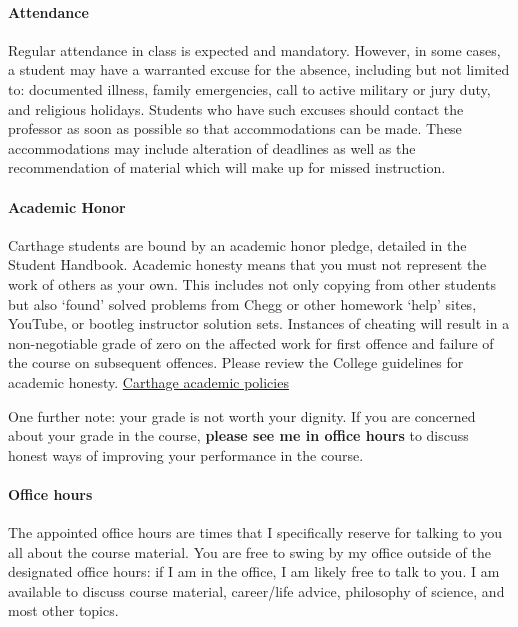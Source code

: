 \paragraph{Attendance}
Regular attendance in class is expected and mandatory. However, in some cases, a student may have a warranted excuse for the absence, including but not limited to: documented illness, family emergencies, call to active military or jury duty, and religious holidays. Students who have such excuses should contact the professor as soon as possible so that accommodations can be made. These accommodations may include alteration of deadlines as well as the recommendation of material which will make up for missed instruction.

\paragraph{Academic Honor} 
Carthage students are bound by an academic honor pledge, detailed in the Student Handbook. Academic honesty means that you must not represent the work of others as your own. This includes not only copying from other students but also ‘found’ solved problems from Chegg or other homework ‘help’ sites, YouTube, or bootleg instructor solution sets. Instances of cheating will result in a non-negotiable grade of zero on the affected work for first offence and failure of the course on subsequent offences. Please review the College guidelines for academic honesty. \href{https://www.carthage.edu/academics/carthage-curriculum/academic-policies/}{Carthage academic policies}

One further note: your grade is not worth your dignity. If you are concerned about your grade in the course, \textbf{please see me in office hours} to discuss honest ways of improving your performance in the course. 

\paragraph{Office hours}
The appointed office hours are times that I specifically reserve for talking to you all about the course material. You are free to swing by my office outside of the designated office hours: if I am in the office, I am likely free to talk to you. I am available to discuss course material, career/life advice, philosophy of science, and most other topics. 

